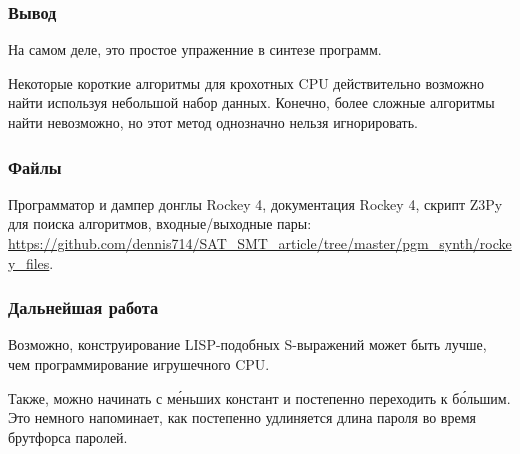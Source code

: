 \subsubsection{Вывод}

На самом деле, это простое упраженние в синтезе программ.

Некоторые короткие алгоритмы для крохотных \ac{CPU} действительно возможно найти используя небольшой набор данных.
Конечно, более сложные алгоритмы найти невозможно,
но этот метод однозначно нельзя игнорировать.

\subsubsection{Файлы}

Программатор и дампер донглы Rockey 4, документация Rockey 4, скрипт Z3Py для поиска алгоритмов, входные/выходные пары:
\url{https://github.com/dennis714/SAT_SMT_article/tree/master/pgm_synth/rockey_files}.

\subsubsection{Дальнейшая работа}

Возможно, конструирование LISP-подобных S-выражений может быть лучше, чем программирование игрушечного CPU.

Также, можно начинать с м\'{е}ньших констант и постепенно переходить к б\'{о}льшим.
Это немного напоминает, как постепенно удлиняется длина пароля во время брутфорса паролей.

